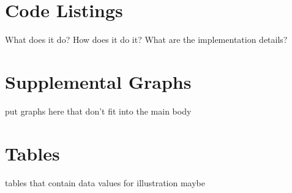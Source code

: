 \documentclass[../00_main.tex]{subfiles}
\begin{document}
\section{Code Listings}

What does it do? How does it do it? What are the implementation details?

\section{Supplemental Graphs}

put graphs here that don't fit into the main body

\section{Tables}

tables that contain data values for illustration maybe
\end{document}
